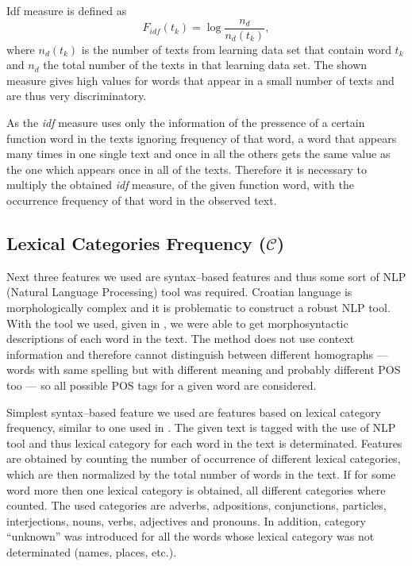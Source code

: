 \documentclass{llncs}
\begin{document}
Idf measure is defined as \cite{diederich2003authorship}
\begin{equation}
F_{idf}(t_k) = \log \frac{n_d}{n_d(t_k)},
\label{equ:idf}
\end{equation}
where $n_d(t_k)$ is the number of texts from learning data set that contain word
$t_k$ and $n_d$ the total number of the texts in that learning data set. The
shown measure gives high values for words that appear in a small number of
texts and are thus very discriminatory.

As the \emph{idf} measure uses only the information of the pressence of a
certain function word in the texts ignoring frequency of that word, a word that appears
many times in one single text and once in all the others gets the same value as
the one which appears once in all of the texts. Therefore it is necessary to
multiply the obtained \emph{idf} measure, of the given function word, with the
occurrence frequency of that word in the observed text.

\subsection{Lexical Categories Frequency ($\mathcal{C}$)}
\label{sec:rijeci-grupe}
Next three features we used are syntax--based features and thus some sort of NLP
(Natural Language Processing) tool was required. Croatian language is
morphologically complex and it is problematic to construct a robust NLP tool.
With the tool we used, given in \cite{snajder08automatic}, we were able to get
morphosyntactic descriptions of each word in the text. The method does not
use context information and therefore cannot distinguish between different
homographs --- words with same spelling but with different meaning and probably
different POS too --- so all possible POS tags for a given word are considered.

Simplest syntax--based feature we used are features based on lexical category
frequency, similar to one used in \cite{kukushkina2001using}. The given text is
tagged with the use of NLP tool and thus lexical category for each word in the text is determinated. Features are obtained by
counting the number of occurrence of different lexical categories, which are
then normalized by the total number of words in the text. If for some word more
then one lexical category is obtained, all different categories where counted. 
The used categories are adverbs, adpositions, conjunctions, particles,
interjections, nouns, verbs, adjectives and pronouns. In addition, category
``unknown'' was introduced for all the words whose lexical category was not
determinated (names, places, etc.).
\end{document}
